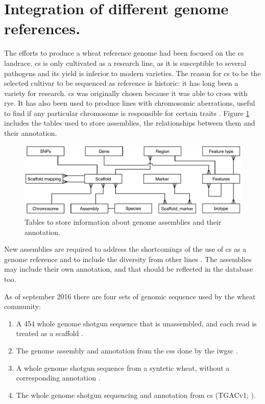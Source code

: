 \section{Integration of different genome references. }

The efforts to produce a wheat reference genome had been focused on the \gls{cs} landrace. 
\acrshort{cs} is only cultivated as a research line, as it is susceptible to several pathogens and its yield is inferior to modern varieties.  
The reason for \acrshort{cs} to be the selected cultivar to be sequenced as reference is historic: it has long been a variety  for research.
\acrshort{cs} was originally chosen because it was able to cross with rye. 
It has also been used to produce lines with chromosomic aberrations, useful to find if any particular chromosome is responsible for certain traits \citep{Sears1985}. 
Figure \ref{fig:discussion:assemblyTables} includes the tables used to store assemblies, the relationships between them and their annotation. 

\begin{figure}
\includegraphics[width=1\textwidth]{Conclusions/Figures/assemblyTables.pdf}
\caption{Tables to store information about genome assemblies and their annotation.}
\label{fig:discussion:assemblyTables}
\end{figure}

New assemblies are required to address the shortcomings of the use of \acrshort{cs} as a genome reference and to include the diversity from other lines \citep{Allen2016,Winfield2016}. 
The assemblies may include their own annotation, and that should be reflected in the database too. 

As of september 2016 there are four sets of genomic sequence used by the wheat community:
\begin{enumerate}
	\item  A 454 whole genome shotgun sequence that is unassembled, and each read is treated as a scaffold \citep{Brenchley2012}.
	\item The genome assembly and annotation from the \gls{css} done by the \acrshort{iwgsc} \citep{Mayer2014}.
	\item A whole genome shotgun sequence from a syntetic wheat, without a corresponding annotation \citep{Chapman2015}.
	\item The whole genome shotgun sequencing and annotation from \acrshort{cs} (TGACv1; \citealt{Clark2016}).
\end{enumerate}

